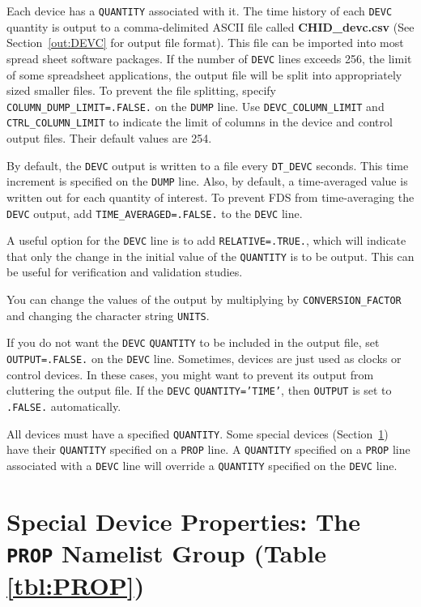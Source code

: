 \documentclass[11pt]{book}
\newcommand{\ct}{\tt\small}
\begin{document}
Each device has a {\ct QUANTITY} associated with it.
The time history of each {\ct DEVC} quantity is output to a comma-delimited
ASCII file called {\bf CHID\_devc.csv}
(See Section~\ref{out:DEVC} for output file format).
This file can be imported into most spread sheet software packages.
If the number of {\ct DEVC} lines exceeds 256, the limit of some spreadsheet
applications, the output file will be split into appropriately sized smaller
files. To prevent the file splitting, specify {\ct COLUMN\_DUMP\_LIMIT=.FALSE.} on the {\ct DUMP} line.
Use {\ct DEVC\_COLUMN\_LIMIT} and {\ct CTRL\_COLUMN\_LIMIT} to indicate the limit of columns in the
device and control output files. Their default values are 254.

By default, the {\ct DEVC} output is written to a file every {\ct DT\_DEVC} seconds.
This time increment is specified on the {\ct DUMP} line. Also, by default,
a time-averaged value is written out for each quantity of interest. To prevent FDS from time-averaging the {\ct DEVC} output, add
{\ct TIME\_AVERAGED=.FALSE.} to the {\ct DEVC} line.

A useful option for the {\ct DEVC} line is to add {\ct RELATIVE=.TRUE.}, which will indicate that only the change in
the initial value of the {\ct QUANTITY} is to be output. This can be useful for verification and validation studies.

You can change the values of the output by multiplying by {\ct CONVERSION\_FACTOR} and changing the character string {\ct UNITS}.

If you do not want the {\ct DEVC} {\ct QUANTITY} to be included in the output file, set {\ct OUTPUT=.FALSE.} on the {\ct DEVC} line. Sometimes, devices are just used as clocks or control devices. In these cases, you might want to prevent its output from cluttering the output file. If the {\ct DEVC} {\ct QUANTITY='TIME'}, then {\ct OUTPUT} is set to {\ct .FALSE.} automatically.


\begin{warning}
All devices must have a specified {\ct QUANTITY}.  Some special devices (Section~\ref{info:PROP}) have their {\ct QUANTITY}
specified on a {\ct PROP} line.
A {\ct QUANTITY} specified on a {\ct PROP} line associated with a {\ct DEVC} line will override a {\ct QUANTITY}
specified on the {\ct DEVC} line.
\end{warning}


\newpage

\section{Special Device Properties: The \texorpdfstring{{\tt PROP}}{PROP} Namelist Group (Table \ref{tbl:PROP})}
\label{info:PROP}
\end{document}
